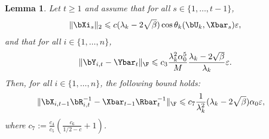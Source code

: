 \documentclass{article}
\theoremstyle{plain}
\newtheorem{lemma}[theorem]{Lemma}
\theoremstyle{definition}
\theoremstyle{remark}
\begin{document}
\begin{lemma}\label{lemma:xiri_xbarrbar_ub}
  Let $t\geqslant 1$ and assume that for all $s \in \{1, \dots, t-1\}$,
  \begin{align*}
    \Vert\bXi_s\Vert_2 \leqslant c (\lambda_k - 2\sqrt{\beta}) \cos \theta_k(\bU_k, \Xbar_s) \varepsilon,
  \end{align*}
  and that for all $i\in\{1,\dots,n\}$,
  \begin{align*}
    \Vert\bY_{i,t} - \Ybar_t \Vert_\F \leqslant c_3\frac{\lambda_k^2 \alpha_0^5}{M} \frac{\lambda_k-2\sqrt{\beta}}{\lambda_k}\varepsilon.
  \end{align*}
  Then, for all $i\in\{1,\dots,n\}$, the following bound holds:
  \begin{align}\label{eq:xiri_xbarrbar_ub}
    \Vert \bX_{i,t-1}\bR_{i,t}^{-1} - \Xbar_{t-1}\Rbar_{t}^{-1} \Vert_\F 
    & \leqslant c_7 \frac{1}{\lambda_k^2} (\lambda_k - 2\sqrt{\beta}) \alpha_0 \varepsilon,
  \end{align}
  where $c_7 := \frac{c_4}{c_5}\left(\frac{c_6}{1/2-c} + 1\right)$.
\end{lemma}
\end{document}
